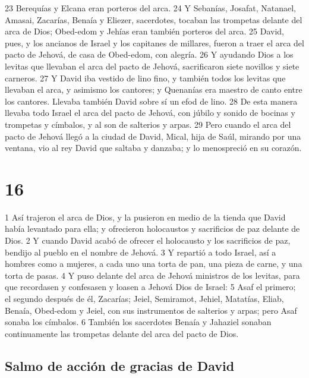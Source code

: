 23 Berequías y Elcana eran porteros del arca.
24 Y Sebanías, Josafat, Natanael, Amasai, Zacarías, Benaía y Eliezer, sacerdotes, tocaban las trompetas delante del arca de Dios; Obed-edom y Jehías eran también porteros del arca.
25 David, pues, y los ancianos de Israel y los capitanes de millares, fueron a traer el arca del pacto de Jehová, de casa de Obed-edom, con alegría.
26 Y ayudando Dios a los levitas que llevaban el arca del pacto de Jehová, sacrificaron siete novillos y siete carneros.
27 Y David iba vestido de lino fino, y también todos los levitas que llevaban el arca, y asimismo los cantores; y Quenanías era maestro de canto entre los cantores. Llevaba también David sobre sí un efod de lino.
28 De esta manera llevaba todo Israel el arca del pacto de Jehová, con júbilo y sonido de bocinas y trompetas y címbalos, y al son de salterios y arpas.
29 Pero cuando el arca del pacto de Jehová llegó a la ciudad de David, Mical, hija de Saúl, mirando por una ventana, vio al rey David que saltaba y danzaba; y lo menospreció en su corazón.

\chapter{16}

1 Así trajeron el arca de Dios, y la pusieron en medio de la tienda que David había levantado para ella; y ofrecieron holocaustos y sacrificios de paz delante de Dios.
2 Y cuando David acabó de ofrecer el holocausto y los sacrificios de paz, bendijo al pueblo en el nombre de Jehová.
3 Y repartió a todo Israel, así a hombres como a mujeres, a cada uno una torta de pan, una pieza de carne, y una torta de pasas.
4 Y puso delante del arca de Jehová ministros de los levitas, para que recordasen y confesasen y loasen a Jehová Dios de Israel:
5 Asaf el primero; el segundo después de él, Zacarías; Jeiel, Semiramot, Jehiel, Matatías, Eliab, Benaía, Obed-edom y Jeiel, con sus instrumentos de salterios y arpas; pero Asaf sonaba los címbalos.
6 También los sacerdotes Benaía y Jahaziel sonaban continuamente las trompetas delante del arca del pacto de Dios.

\section*{Salmo de acción de gracias de David}


